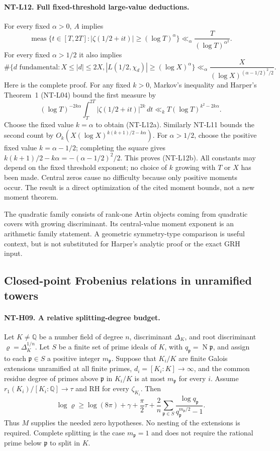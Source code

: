 \documentclass[11pt,a4paper]{article}
\begin{document}
\paragraph{NT-L12. Full fixed-threshold large-value deductions.}
For every fixed $\alpha>0$, $A$ implies
\[
 \operatorname{meas}\{t\in[T,2T]:
            |\zeta(1/2+it)|\ge(\log T)^\alpha\}
       \ll_\alpha \frac{T}{(\log T)^{\alpha^2}}.
\tag{NT-L12a}
\]
For every fixed $\alpha>1/2$ it also implies
\[
 \#\{d\text{ fundamental}:X\le|d|\le2X,
          |L(1/2,\chi_d)|\ge(\log X)^\alpha\}
       \ll_\alpha
          \frac{X}{(\log X)^{(\alpha-1/2)^2/2}}.
\tag{NT-L12b}
\]
Here is the complete proof.  For any fixed $k>0$, Markov's
inequality and Harper's Theorem~1 (NT-L04) bound the first measure by
\[
 (\log T)^{-2k\alpha}
       \int_T^{2T}|\zeta(1/2+it)|^{2k}\,dt
       \ll_k T(\log T)^{k^2-2k\alpha}.
\]
Choose the fixed value $k=\alpha$ to obtain (NT-L12a).
Similarly NT-L11 bounds the second count by
$O_k(X(\log X)^{k(k+1)/2-k\alpha})$.
For $\alpha>1/2$, choose the positive fixed value
$k=\alpha-1/2$; completing the square gives
$k(k+1)/2-k\alpha=-(\alpha-1/2)^2/2$.
This proves (NT-L12b).  All constants may depend on the fixed
threshold exponent; no choice of $k$ growing with $T$ or $X$ has
been made.  Central zeros cause no difficulty because only positive
moments occur.  The result is a direct optimization of the cited
moment bounds, not a new moment theorem.

The quadratic family consists of rank-one Artin objects coming from
quadratic covers with growing discriminant.  Its central-value
moment exponent is an arithmetic family statement.  A geometric
symmetry-type comparison is useful context, but is not substituted
for Harper's analytic proof or the exact GRH input.

\subsection{Closed-point Frobenius relations in unramified towers}

\paragraph{NT-H09. A relative splitting-degree budget.}
Let $K\ne\mathbb Q$ be a number field of degree $n$, discriminant
$\Delta_K$, and root discriminant $\varrho=\Delta_K^{1/n}$.
Let $S$ be a finite set of prime ideals of $K$, with
$q_{\mathfrak p}=\operatorname N\mathfrak p$, and assign to each
$\mathfrak p\in S$ a positive integer $m_{\mathfrak p}$.
Suppose that $K_i/K$ are finite Galois extensions unramified at all
finite primes, $d_i=[K_i:K]\to\infty$, and the common residue
degree of primes above $\mathfrak p$ in $K_i/K$ is at most
$m_{\mathfrak p}$ for every $i$.  Assume
$r_1(K_i)/[K_i:\mathbb Q]\to\tau$ and RH for every
$\zeta_{K_i}$.  Then
\[
 \log\varrho\ge\log(8\pi)+\gamma+\frac\pi2\tau
  +\frac2n\sum_{\mathfrak p\in S}
       \frac{\log q_{\mathfrak p}}
            {q_{\mathfrak p}^{m_{\mathfrak p}/2}-1}.
\tag{NT-H09}
\]
Thus $M$ supplies the needed zero hypotheses.  No nesting of the
extensions is required.  Complete splitting is the case
$m_{\mathfrak p}=1$ and does not require the rational prime below
$\mathfrak p$ to split in $K$.
\end{document}
